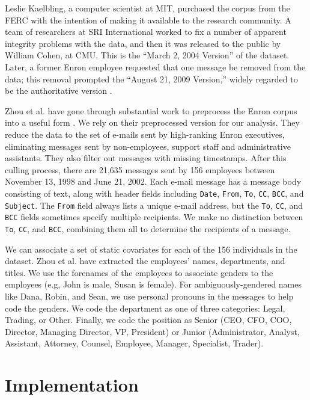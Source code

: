 \documentclass[aoas,preprint]{imsart}
\begin{document}
Leslie Kaelbling, a computer scientist at MIT, purchased the corpus from the
FERC with the intention of making it available to the research community. A
team of researchers at SRI International worked to fix a number of apparent
integrity problems with the data, and then it was released to the public by
William Cohen, at CMU. This is the ``March 2, 2004 Version'' of the dataset.
Later, a former Enron employee requested that one message be removed from the
data; this removal prompted the ``August 21, 2009 Version,'' widely regarded
to be the authoritative version \cite{cohen2009enron}.

Zhou et al. have gone through substantial work to preprocess the Enron corpus
into a useful form \cite{zhou2007strategies}. We rely on their preprocessed
version for our analysis. They reduce the data to the set of e-mails sent by
high-ranking Enron executives, eliminating messages sent by non-employees,
support staff and administrative assistants. They also filter out messages
with missing timestamps. After this culling process, there are 21,635 messages
sent by 156 employees between November 13, 1998 and June 21, 2002. Each e-mail
message has a message body consisting of text, along with header fields
including \texttt{Date}, \texttt{From}, \texttt{To}, \texttt{CC},
\texttt{BCC}, and \texttt{Subject}. The \texttt{From} field always lists a
unique e-mail address, but the \texttt{To}, \texttt{CC}, and \texttt{BCC}
fields sometimes specify multiple recipients. We make no distinction between
\texttt{To}, \texttt{CC}, and \texttt{BCC}, combining them all to determine
the recipients of a message.

We can associate a set of static covariates for each of the 156 individuals in
the dataset. Zhou et al. have extracted the employees' names, departments, and
titles. We use the forenames of the employees to associate genders to the
employees (e.g, John is male, Susan is female). For ambiguously-gendered names
like Dana, Robin, and Sean, we use personal pronouns in the messages to help
code the genders. We code the department as one of three categories: Legal,
Trading, or Other. Finally, we code the position as Senior (CEO, CFO, COO,
Director, Managing Director, VP, President) or Junior (Administrator, Analyst,
Assistant, Attorney, Counsel, Employee, Manager, Specialist, Trader).



\section{Implementation}\label{S:implementaiton}
\end{document}
